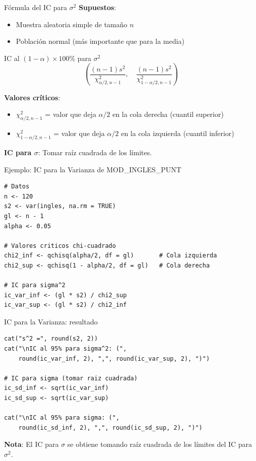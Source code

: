 \documentclass[aspectratio=169, 11pt]{beamer}
\begin{document}
\begin{frame}{Fórmula del IC para $\sigma^2$}
\textbf{Supuestos}:
\begin{itemize}
  \item Muestra aleatoria simple de tamaño $n$
  \item Población \alert{normal} (más importante que para la media)
\end{itemize}

\vspace{0.3cm}
\begin{block}{IC al $(1-\alpha) \times 100\%$ para $\sigma^2$}
\[
\left( \frac{(n-1)s^2}{\chi^2_{\alpha/2, n-1}}, \quad \frac{(n-1)s^2}{\chi^2_{1-\alpha/2, n-1}} \right)
\]
\end{block}

\vspace{0.3cm}
\textbf{Valores críticos}:
\begin{itemize}
  \item $\chi^2_{\alpha/2, n-1}$ = valor que deja $\alpha/2$ en la cola \alert{derecha} (cuantil superior)
  \item $\chi^2_{1-\alpha/2, n-1}$ = valor que deja $\alpha/2$ en la cola \alert{izquierda} (cuantil inferior)
\end{itemize}

\vspace{0.3cm}
\textbf{IC para $\sigma$}: Tomar raíz cuadrada de los límites.
\end{frame}

\begin{frame}[fragile]{Ejemplo: IC para la Varianza de MOD\_INGLES\_PUNT}
\begin{lstlisting}
# Datos
n <- 120
s2 <- var(ingles, na.rm = TRUE)
gl <- n - 1
alpha <- 0.05

# Valores criticos chi-cuadrado
chi2_inf <- qchisq(alpha/2, df = gl)       # Cola izquierda
chi2_sup <- qchisq(1 - alpha/2, df = gl)   # Cola derecha

# IC para sigma^2
ic_var_inf <- (gl * s2) / chi2_sup
ic_var_sup <- (gl * s2) / chi2_inf
\end{lstlisting}
\end{frame}

\begin{frame}[fragile]{IC para la Varianza: resultado}
\begin{lstlisting}
cat("s^2 =", round(s2, 2))
cat("\nIC al 95% para sigma^2: (",
    round(ic_var_inf, 2), ",", round(ic_var_sup, 2), ")")

# IC para sigma (tomar raiz cuadrada)
ic_sd_inf <- sqrt(ic_var_inf)
ic_sd_sup <- sqrt(ic_var_sup)

cat("\nIC al 95% para sigma: (",
    round(ic_sd_inf, 2), ",", round(ic_sd_sup, 2), ")")
\end{lstlisting}

\vspace{0.3cm}
\textbf{Nota}: El IC para $\sigma$ se obtiene tomando raíz cuadrada de los límites del IC para $\sigma^2$.
\end{frame}
\end{document}
